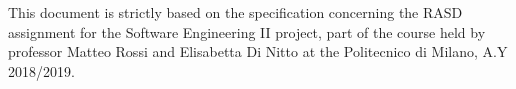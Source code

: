 This document is strictly based on the specification concerning the RASD assignment for the Software Engineering II project, part of the course held by professor Matteo Rossi and Elisabetta Di Nitto at the Politecnico di Milano, A.Y 2018/2019.
